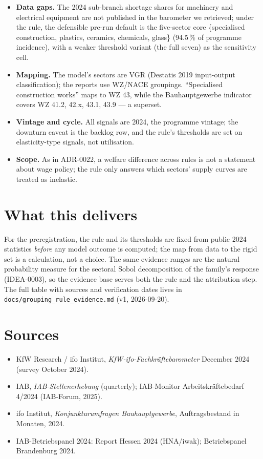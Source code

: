 \documentclass[11pt]{article}
\begin{document}
\begin{itemize}
\item \textbf{Data gaps.} The 2024 sub-branch shortage shares for
  machinery and electrical equipment are not published in the barometer we
  retrieved; under the rule, the defensible pre-run default is the
  five-sector core \{specialised construction, plastics, ceramics,
  chemicals, glass\} (94.5\,\% of programme incidence), with a weaker
  threshold variant (the full seven) as the sensitivity cell.
\item \textbf{Mapping.} The model's sectors are VGR (Destatis 2019
  input-output classification); the reports use WZ/NACE groupings.
  ``Specialised construction works'' maps to WZ 43, while the
  Bauhauptgewerbe indicator covers WZ 41.2, 42.x, 43.1, 43.9 --- a superset.
\item \textbf{Vintage and cycle.} All signals are 2024, the programme
  vintage; the downturn caveat is the backlog row, and the rule's thresholds
  are set on elasticity-type signals, not utilisation.
\item \textbf{Scope.} As in ADR-0022, a welfare difference across rules is
  not a statement about wage policy; the rule only answers which sectors'
  supply curves are treated as inelastic.
\end{itemize}

\section{What this delivers}\label{sec:delivers}

For the preregistration, the rule and its thresholds are fixed from public
2024 statistics \emph{before} any model outcome is computed; the map from
data to the rigid set is a calculation, not a choice. The same evidence
ranges are the natural probability measure for the sectoral Sobol
decomposition of the family's response (IDEA-0003), so the evidence base
serves both the rule and the attribution step. The full table with sources
and verification dates lives in \texttt{docs/grouping\_rule\_evidence.md}
(v1, 2026-09-20).

\section*{Sources}

\begin{itemize}
\item KfW Research / ifo Institut, \emph{KfW-ifo-Fachkr\"aftebarometer}
  December 2024 (survey October 2024).
\item IAB, \emph{IAB-Stellenerhebung} (quarterly); IAB-Monitor
  Arbeitskr\"aftebedarf 4/2024 (IAB-Forum, 2025).
\item ifo Institut, \emph{Konjunkturumfragen Bauhauptgewerbe},
  Auftragsbestand in Monaten, 2024.
\item IAB-Betriebspanel 2024: Report Hessen 2024 (HNA/iwak); Betriebspanel
  Brandenburg 2024.
\end{itemize}
\end{document}
